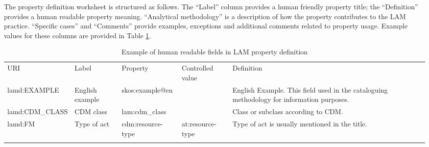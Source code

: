 The property definition worksheet is structured as follows.
The ``Label'' column provides a human friendly property title;
the ``Definition'' provides a human readable property meaning.
``Analytical methodology'' is a description of how the property contributes to the LAM practice.
 ``Specific cases'' and ``Comments'' provide examples, exceptions and
additional comments related to property usage. Example values for these
columns are provided in Table \ref{tab:ex1}.

{
\fontsize{10pt}{10pt}
\selectfont%
\begin{longtable}[c]{@{}p{2.73cm}p{1.7cm}p{2.5cm}p{1.62cm}p{4.75cm}@{}}
	\toprule\addlinespace
	URI  & Label & Property & Controlled value & Definition
	\\\addlinespace
	\midrule\endhead
	lamd:EXAMPLE & English example & skos:example@en & &
	English Example. This field used in the cataloguing methodology for
	information purposes.
	\\\addlinespace
	lamd:CDM\_CLASS & CDM class & lam:cdm\_class & & Class
	or subclass according to CDM.
	\\\addlinespace
	lamd:FM & Type of act & cdm:resource-type & at:resource-type &
	Type of act is usually mentioned in the title.
	\\\addlinespace
	\bottomrule
	\addlinespace
	\caption{Example of human readable fields in LAM property definition}
	\label{tab:ex1}
	\vspace{-10pt}
\end{longtable}
}





